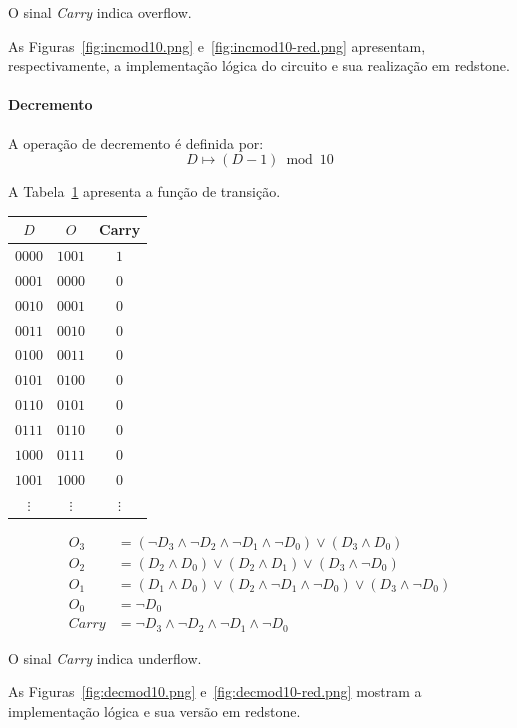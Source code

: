O sinal \textit{Carry} indica overflow.

As Figuras~\ref{fig:incmod10.png} e~\ref{fig:incmod10-red.png} apresentam, respectivamente, a implementação lógica do circuito e sua realização em redstone.


\paragraph{Decremento}

A operação de decremento é definida por:
\[
D \mapsto (D - 1) \bmod 10
\]

A Tabela~\ref{tab:dec_mod10} apresenta a função de transição.

\begin{table} [H] \label{tab:dec_mod10}
\begin{center}
\begin{tabular}{c|cc}
    $D$ & $O$ & Carry \\
    \hline
    $0000$ & $1001$ & $1$ \\
    $0001$ & $0000$ & $0$ \\
    $0010$ & $0001$ & $0$ \\
    $0011$ & $0010$ & $0$ \\
    $0100$ & $0011$ & $0$ \\
    $0101$ & $0100$ & $0$ \\
    $0110$ & $0101$ & $0$ \\
    $0111$ & $0110$ & $0$ \\
    $1000$ & $0111$ & $0$ \\
    $1001$ & $1000$ & $0$ \\
    $\vdots$ & $\vdots$ & $\vdots$ \\
\end{tabular}
\end{center}
\end{table}

\begin{align*}
    O_3 &= (\lnot D_3 \land \lnot D_2 \land \lnot D_1 \land \lnot D_0) \lor (D_3 \land D_0) \\[4pt]
    O_2 &= (D_2 \land D_0) \lor (D_2 \land D_1) \lor (D_3 \land \lnot D_0) \\[4pt]
    O_1 &= (D_1 \land D_0) \lor (D_2 \land \lnot D_1 \land \lnot D_0) \lor (D_3 \land \lnot D_0) \\[4pt]
    O_0 &= \lnot D_0 \\[4pt]
    Carry &= \lnot D_3 \land \lnot D_2 \land \lnot D_1 \land \lnot D_0
\end{align*}

O sinal \textit{Carry} indica underflow.

As Figuras~\ref{fig:decmod10.png} e~\ref{fig:decmod10-red.png} mostram a implementação lógica e sua versão em redstone.

